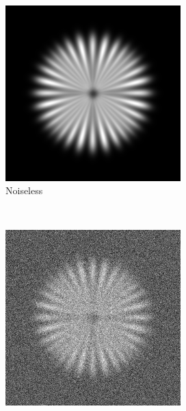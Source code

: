 \documentclass{./packages/optica-article}
\begin{document}
\begin{figure}[hbp]
	\begin{center}
		\,\hfill
		\begin{subfigure}[t]{0.25\textwidth}\centering
			\centering
			\includegraphics[width=\textwidth]{Simulation deconvolution/ref_conv}
			\caption{Noiseless}\label{fig:sim:conv}
		\end{subfigure}
		\,\hfill
		\begin{subfigure}[t]{0.25\textwidth}\centering
			\centering
			\includegraphics[width=\textwidth]{Simulation deconvolution/ref_ng_0.1}

\end{subfigure}
\end{center}
\end{figure}
\end{document}
